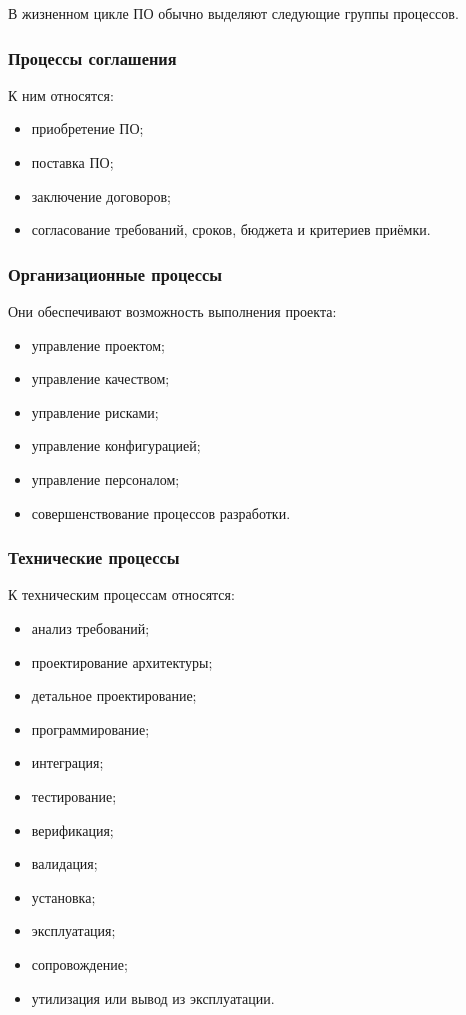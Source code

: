 \documentclass[12pt,a4paper]{article}
\begin{document}
В жизненном цикле ПО обычно выделяют следующие группы процессов.

\subsubsection{Процессы соглашения}

К ним относятся:
\begin{itemize}
    \item приобретение ПО;
    \item поставка ПО;
    \item заключение договоров;
    \item согласование требований, сроков, бюджета и критериев приёмки.
\end{itemize}

\subsubsection{Организационные процессы}

Они обеспечивают возможность выполнения проекта:
\begin{itemize}
    \item управление проектом;
    \item управление качеством;
    \item управление рисками;
    \item управление конфигурацией;
    \item управление персоналом;
    \item совершенствование процессов разработки.
\end{itemize}

\subsubsection{Технические процессы}

К техническим процессам относятся:
\begin{itemize}
    \item анализ требований;
    \item проектирование архитектуры;
    \item детальное проектирование;
    \item программирование;
    \item интеграция;
    \item тестирование;
    \item верификация;
    \item валидация;
    \item установка;
    \item эксплуатация;
    \item сопровождение;
    \item утилизация или вывод из эксплуатации.
\end{itemize}
\end{document}
